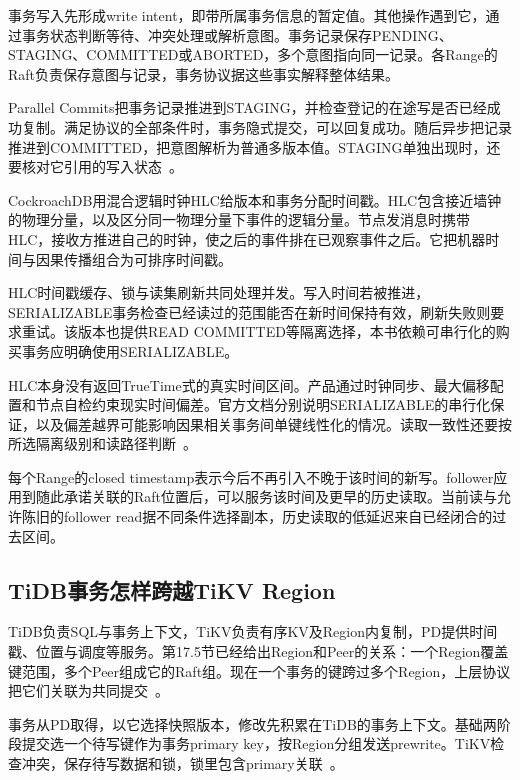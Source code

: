 事务写入先形成write intent，即带所属事务信息的暂定值。其他操作遇到它，通过事务状态判断等待、冲突处理或解析意图。事务记录保存PENDING、STAGING、COMMITTED或ABORTED，多个意图指向同一记录。各Range的Raft负责保存意图与记录，事务协议据这些事实解释整体结果。

Parallel Commits把事务记录推进到STAGING，并检查登记的在途写是否已经成功复制。满足协议的全部条件时，事务隐式提交，可以回复成功。随后异步把记录推进到COMMITTED，把意图解析为普通多版本值。STAGING单独出现时，还要核对它引用的写入状态~\cite{crdb254-transactions}。


CockroachDB用混合逻辑时钟HLC给版本和事务分配时间戳。HLC包含接近墙钟的物理分量，以及区分同一物理分量下事件的逻辑分量。节点发消息时携带HLC，接收方推进自己的时钟，使之后的事件排在已观察事件之后。它把机器时间与因果传播组合为可排序时间戳。


HLC时间戳缓存、锁与读集刷新共同处理并发。写入时间若被推进，SERIALIZABLE事务检查已经读过的范围能否在新时间保持有效，刷新失败则要求重试。该版本也提供READ COMMITTED等隔离选择，本书依赖可串行化的购买事务应明确使用SERIALIZABLE。

HLC本身没有返回TrueTime式的真实时间区间。产品通过时钟同步、最大偏移配置和节点自检约束现实时间偏差。官方文档分别说明SERIALIZABLE的串行化保证，以及偏差越界可能影响因果相关事务间单键线性化的情况。读取一致性还要按所选隔离级别和读路径判断~\cite{crdb254-transactions}。

每个Range的closed timestamp表示今后不再引入不晚于该时间的新写。follower应用到随此承诺关联的Raft位置后，可以服务该时间及更早的历史读取。当前读与允许陈旧的follower read据不同条件选择副本，历史读取的低延迟来自已经闭合的过去区间。

\subsection{TiDB事务怎样跨越TiKV Region}

TiDB负责SQL与事务上下文，TiKV负责有序KV及Region内复制，PD提供时间戳、位置与调度等服务。第17.5节已经给出Region和Peer的关系：一个Region覆盖键范围，多个Peer组成它的Raft组。现在一个事务的键跨过多个Region，上层协议把它们关联为共同提交~\cite{tikv-75-storage,tidb-75-pd}。

事务从PD取得，以它选择快照版本，修改先积累在TiDB的事务上下文。基础两阶段提交选一个待写键作为事务primary key，按Region分组发送prewrite。TiKV检查冲突，保存待写数据和锁，锁里包含primary关联~\cite{tidb75-commit}。

